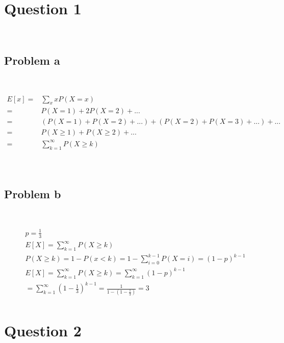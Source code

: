 \documentclass{article}
\begin{document}
\section*{Question 1}

~

\subsection*{Problem a}

~

\begin{equation*}
    \begin{split}
        E[x]=&\sum_{x}xP(X=x)\\
        =&P(X=1)+2P(X=2)+...\\
        =&(P(X=1)+P(X=2)+...)+(P(X=2)+P(X=3)+...)+...\\
        =&P(X\geqslant 1)+P(X\geqslant 2)+...\\
        =&\sum_{k=1}^{\infty}P(X\geqslant k)\\
    \end{split}
\end{equation*}

~

\subsection*{Problem b}

~

\begin{equation*}
    \begin{split}
        &p=\frac{1}{3}\\
        &E[X]=\sum_{k=1}^{\infty}P(X\geqslant k)\\
        &P(X\geqslant k)=1-P(x<k)=1-\sum_{i=0}^{k-1}P(X=i)=(1-p)^{k-1}\\
        &E[X]=\sum_{k=1}^{\infty}P(X\geqslant k)=\sum_{k=1}^{\infty}(1-p)^{k-1}\\
        &=\sum_{k=1}^{\infty}(1-\frac{1}{3})^{k-1}=\frac{1}{1-(1-\frac{1}{3})}=3\\
    \end{split}
\end{equation*}

\newpage

\section*{Question 2}

~
\end{document}
